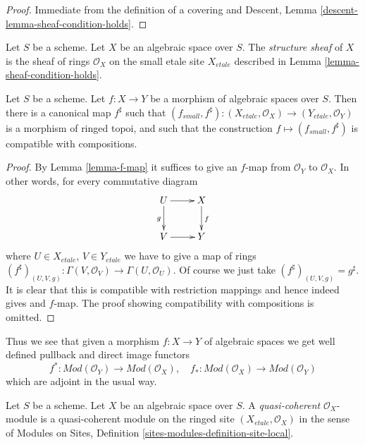 \begin{proof}
Immediate from the definition of a covering and
Descent, Lemma \ref{descent-lemma-sheaf-condition-holds}.
\end{proof}

\begin{definition}
\label{definition-structure-sheaf}
Let $S$ be a scheme.
Let $X$ be an algebraic space over $S$.
The {\it structure sheaf} of $X$
is the sheaf of rings $\mathcal{O}_X$
on the small etale site $X_{etale}$ described in
Lemma \ref{lemma-sheaf-condition-holds}.
\end{definition}

\begin{lemma}
\label{lemma-morphism-ringed-topoi}
Let $S$ be a scheme.
Let $f : X \to Y$ be a morphism of algebraic spaces over $S$.
Then there is a canonical map $f^\sharp$ such that
$(f_{small}, f^\sharp) :
(X_{etale}, \mathcal{O}_X)
\to
(Y_{etale}, \mathcal{O}_Y)$
is a morphism of ringed topoi, and such that the construction
$f \mapsto (f_{small}, f^\sharp)$ is compatible with compositions.
\end{lemma}

\begin{proof}
By Lemma \ref{lemma-f-map} it suffices to give an $f$-map from
$\mathcal{O}_Y$ to $\mathcal{O}_X$. In other words, for every
commutative diagram
$$
\xymatrix{
U \ar[d]_g \ar[r] & X \ar[d]^f \\
V \ar[r] & Y
}
$$
where $U \in X_{etale}$, $V \in Y_{etale}$ we have to give a map of
rings
$
(f^\sharp)_{(U, V, g)} :
\Gamma(V, \mathcal{O}_V)
\to
\Gamma(U, \mathcal{O}_U).
$
Of course we just take $(f^\sharp)_{(U, V, g)} = g^\sharp$.
It is clear that this is compatible with restriction mappings
and hence indeed gives and $f$-map.
The proof showing compatibility with compositions is omitted.
\end{proof}

\noindent
Thus we see that given a morphism $f : X \to Y$ of algebraic spaces
we get well defined pullback and direct image functors
$$
f^* :
\textit{Mod}(\mathcal{O}_Y)
\longrightarrow
\textit{Mod}(\mathcal{O}_X), \quad
f_* :
\textit{Mod}(\mathcal{O}_X)
\longrightarrow
\textit{Mod}(\mathcal{O}_Y)
$$
which are adjoint in the usual way.

\begin{definition}
\label{definition-quasi-coherent}
Let $S$ be a scheme.
Let $X$ be an algebraic space over $S$.
A {\it quasi-coherent} $\mathcal{O}_X$-module 
is a quasi-coherent module on the ringed site $(X_{etale}, \mathcal{O}_X)$
in the sense of
Modules on Sites,
Definition \ref{sites-modules-definition-site-local}.
\end{definition}

